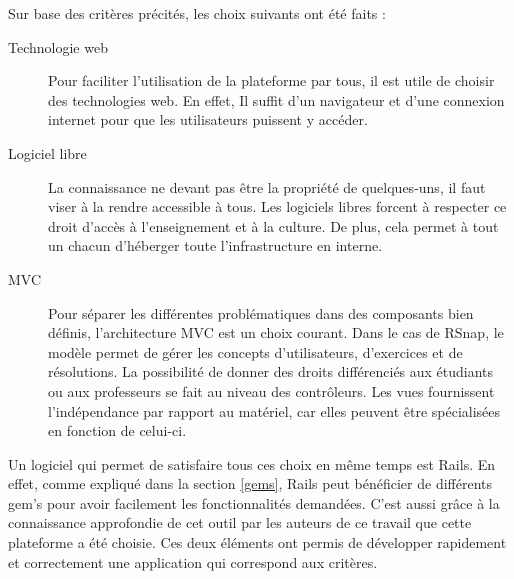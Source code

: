 Sur base des critères précités, les choix suivants ont été faits :
\begin{description}
  \item[Technologie web] Pour faciliter l'utilisation de la plateforme par tous, il est utile de choisir des technologies web. En effet, Il suffit d'un navigateur et d'une connexion internet pour que les utilisateurs puissent y accéder.
  \item[Logiciel libre] La connaissance ne devant pas être la propriété de quelques-uns, il faut viser à la rendre accessible à tous. Les logiciels libres forcent à respecter ce droit d'accès à l'enseignement et à la culture. De plus, cela permet à tout un chacun d'héberger toute l'infrastructure en interne.
  \item[MVC] Pour séparer les différentes problématiques dans des composants bien définis, l'architecture MVC est un choix courant. Dans le cas de RSnap, le modèle permet de gérer les concepts d'utilisateurs, d'exercices et de résolutions. La possibilité de donner des droits différenciés aux étudiants ou aux professeurs se fait au niveau des contrôleurs. Les vues fournissent l'indépendance par rapport au matériel, car elles peuvent être spécialisées en fonction de celui-ci.
\end{description}
Un logiciel qui permet de satisfaire tous ces choix en même temps est Rails. En effet, comme expliqué dans la section \ref{gems}, Rails peut bénéficier de différents gem's pour avoir facilement les fonctionnalités demandées. C'est aussi grâce à la connaissance approfondie de cet outil par les auteurs de ce travail que cette plateforme a été choisie. Ces deux éléments ont permis de développer rapidement et correctement une application qui correspond aux critères. 




